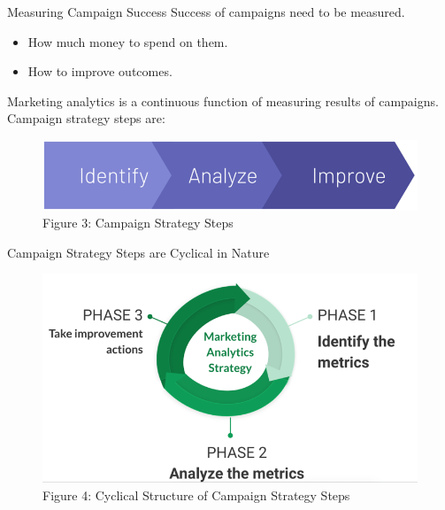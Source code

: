 \documentclass[pdf]{beamer}
\theoremstyle{remark}
\theoremstyle{definition}
\begin{document}
\begin{frame}[t]{Measuring Campaign Success}
Success of campaigns need to be measured.
\begin{itemize}
\item How much money to spend on them.
\item How to improve outcomes.
\end{itemize}
Marketing analytics is a continuous function of measuring results of campaigns.
\\
\vspace{1.5ex}
Campaign strategy steps are:
\\
\vspace{1.5ex}
\begin{figure}[htbp]
    \centering
    \captionsetup{justification=centering}
    \includegraphics[clip, trim=0.0cm 0.0cm 0.0cm 0.0cm, width=1\textwidth]{Images/Picture1.png}  
    \caption{Figure {\color{franklinblue} 3}:  Campaign Strategy Steps}
    \label{fig:campstrag}
\end{figure} 
\end{frame}

\begin{frame}[t]{Campaign Strategy Steps are Cyclical in Nature}
\begin{figure}[htbp]
    \centering
    \captionsetup{justification=centering}
    \includegraphics[clip, trim=0.0cm 0.0cm 0.0cm 0.0cm, width=1\textwidth]{Images/Picture2.png}  
    \caption{Figure {\color{franklinblue} 4}:  Cyclical Structure of Campaign Strategy Steps}
    \label{fig:campstrag}
\end{figure} 
\end{frame}
\end{document}
